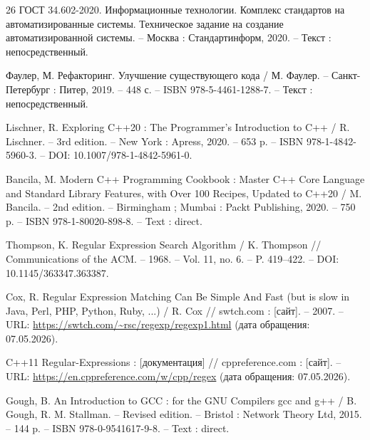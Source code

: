 \begin{thebibliography}{26}
	ГОСТ 34.602-2020. Информационные технологии. Комплекс стандартов на автоматизированные системы. Техническое задание на создание автоматизированной системы. -- Москва : Стандартинформ, 2020. -- Текст : непосредственный.
	
	Фаулер, М. Рефакторинг. Улучшение существующего кода / М. Фаулер. -- Санкт-Петербург : Питер, 2019. -- 448 с. -- ISBN 978-5-4461-1288-7. -- Текст : непосредственный.
	
	Lischner, R. Exploring C++20 : The Programmer's Introduction to C++ / R. Lischner. -- 3rd edition. -- New York : Apress, 2020. -- 653 p. -- ISBN 978-1-4842-5960-3. -- DOI: 10.1007/978-1-4842-5961-0.
	
	Bancila, M. Modern C++ Programming Cookbook : Master C++ Core Language and Standard Library Features, with Over 100 Recipes, Updated to C++20 / M. Bancila. -- 2nd edition. -- Birmingham ; Mumbai : Packt Publishing, 2020. -- 750 p. -- ISBN 978-1-80020-898-8. -- Text : direct.
	
	Thompson, K. Regular Expression Search Algorithm / K. Thompson // Communications of the ACM. -- 1968. -- Vol. 11, no. 6. -- P. 419--422. -- DOI: 10.1145/363347.363387.
	
	Cox, R. Regular Expression Matching Can Be Simple And Fast (but is slow in Java, Perl, PHP, Python, Ruby, ...) / R. Cox // swtch.com : [сайт]. -- 2007. -- URL: \url{https://swtch.com/~rsc/regexp/regexp1.html} (дата обращения: 07.05.2026).
	
	C++11 Regular-Expressions : [документация] // cppreference.com : [сайт]. -- URL: \url{https://en.cppreference.com/w/cpp/regex} (дата обращения: 07.05.2026).
	
	Gough, B. An Introduction to GCC : for the GNU Compilers gcc and g++ / B. Gough, R. M. Stallman. -- Revised edition. -- Bristol : Network Theory Ltd, 2015. -- 144 p. -- ISBN 978-0-9541617-9-8. -- Text : direct.
 
\end{thebibliography}

